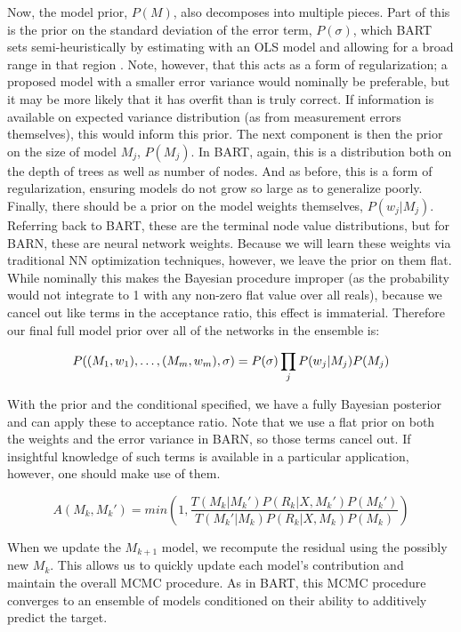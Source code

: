 \documentclass[12pt]{article}
\begin{document}
Now, the model prior, $P(M)$, also decomposes into multiple pieces.  Part of this is the prior on the standard deviation of the error term, $P(\sigma)$, which BART sets semi-heuristically by estimating with an OLS model and allowing for a broad range in that region \cite{chipman2010bart}.  Note, however, that this acts as a form of regularization; a proposed model with a smaller error variance would nominally be preferable, but it may be more likely that it has overfit than is truly correct.  If information is available on expected variance distribution (as from measurement errors themselves), this would inform this prior.  The next component is then the prior on the size of model $M_j$, $P(M_j)$.  In BART, again, this is a distribution both on the depth of trees as well as number of nodes.  And as before, this is a form of regularization, ensuring models do not grow so large as to generalize poorly.  Finally, there should be a prior on the model weights themselves, $P(w_j|M_j)$.  Referring back to BART, these are the terminal node value distributions, but for BARN, these are neural network weights.  Because we will learn these weights via traditional NN optimization techniques, however, we leave the prior on them flat.  While nominally this makes the Bayesian procedure improper (as the probability would not integrate to 1 with any non-zero flat value over all reals), because we cancel out like terms in the acceptance ratio, this effect is immaterial.  Therefore our final full model prior over all of the networks in the ensemble is:

$$
P((M_1, w_1), \ldots, (M_m, w_m),\sigma) = P(\sigma) \prod_j P(w_j|M_j)P(M_j)\\
$$

With the prior and the conditional specified, we have a fully Bayesian posterior and can apply these to acceptance ratio.  Note that we use a flat prior on both the weights and the error variance in BARN, so those terms cancel out.  If insightful knowledge of such terms is available in a particular application, however, one should make use of them.

$$
A(M_k,M_k') = min(1, \frac{T(M_k|M_k') P(R_k|X,M_k')P(M_k')}{T(M_k'|M_k) P(R_k|X,M_k)P(M_k)})
$$

When we update the $M_{k+1}$ model, we recompute the residual using the possibly new $M_k$.  This allows us to quickly update each model's contribution and maintain the overall MCMC procedure.  As in BART, this MCMC procedure converges to an ensemble of models conditioned on their ability to additively predict the target.
\end{document}
